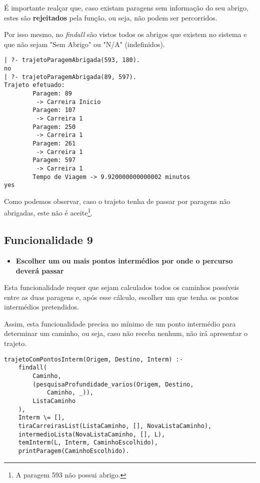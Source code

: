 \documentclass[a4paper,12pt]{report}
\begin{document}
\par É importante realçar que, caso existam paragens sem informação do seu abrigo, estes são \textbf{rejeitados} pela função, ou seja, não podem ser percorridos.
\par Por isso mesmo, no \textit{findall} são vistos todos os abrigos que existem no sistema e que não sejam "Sem Abrigo"\hspace{0.001cm} ou "N/A"\hspace{0.001cm} (indefinidos).

\begin{verbatim}
| ?- trajetoParagemAbrigada(593, 180).
no
| ?- trajetoParagemAbrigada(89, 597).
Trajeto efetuado: 
        Paragem: 89
         -> Carreira Inicio
        Paragem: 107
         -> Carreira 1
        Paragem: 250
         -> Carreira 1
        Paragem: 261
         -> Carreira 1
        Paragem: 597
         -> Carreira 1
        Tempo de Viagem -> 9.920000000000002 minutos
yes
\end{verbatim}

\par Como podemos observar, caso o trajeto tenha de passar por paragens não abrigadas, este não é aceite\footnote{A paragem 593 não possui abrigo.}.


\vspace{5cm}

\subsection{Funcionalidade 9}
\begin{itemize}
    \item \textbf{Escolher um ou mais pontos intermédios por onde o percurso deverá passar}
\end{itemize}

\par Esta funcionalidade requer que sejam calculados todos os caminhos possíveis entre as duas paragens e, após esse cálculo, escolher um que tenha os pontos intermédios pretendidos.
\par Assim, esta funcionalidade precisa no mínimo de um ponto intermédio para determinar um caminho, ou seja, caso não receba nenhum, não irá apresentar o trajeto.

\begin{verbatim}
trajetoComPontosInterm(Origem, Destino, Interm) :-
    findall(
        Caminho,
        (pesquisaProfundidade_varios(Origem, Destino,
            Caminho, _)),
        ListaCaminho
    ),
    Interm \= [],
    tiraCarreirasList(ListaCaminho, [], NovaListaCaminho),
    intermedioLista(NovaListaCaminho, [], L),
    temInterm(L, Interm, CaminhoEscolhido),
    printParagem(CaminhoEscolhido).
\end{verbatim} 
\end{document}
